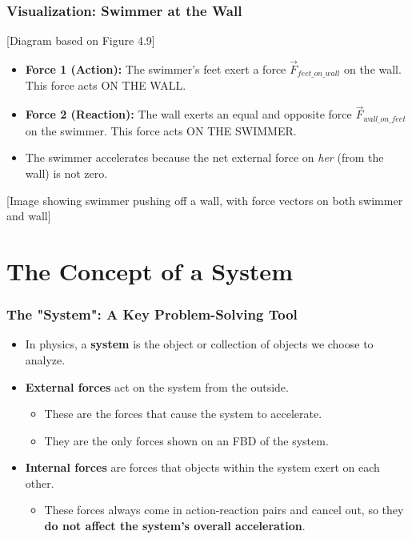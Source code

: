\documentclass{beamer}
\begin{document}
\begin{frame}
\frametitle{Visualization: Swimmer at the Wall}
\begin{alertblock}{[Diagram based on Figure 4.9]}
    \begin{itemize}
        \item \textbf{Force 1 (Action):} The swimmer's feet exert a force $\vec{F}_{feet\_on\_wall}$ on the wall. This force acts ON THE WALL.
        \pause
        \item \textbf{Force 2 (Reaction):} The wall exerts an equal and opposite force $\vec{F}_{wall\_on\_feet}$ on the swimmer. This force acts ON THE SWIMMER.
        \pause
        \item The swimmer accelerates because the net external force on \textit{her} (from the wall) is not zero.
    \end{itemize}
    \alert{[Image showing swimmer pushing off a wall, with force vectors on both swimmer and wall]}
\end{alertblock}
\end{frame}

\section{The Concept of a System}

\begin{frame}
\frametitle{The "System": A Key Problem-Solving Tool}
\begin{itemize}
    \item In physics, a \textbf{system} is the object or collection of objects we choose to analyze. \pause
    \item \textbf{External forces} act on the system from the outside.
    \begin{itemize}
        \item These are the forces that cause the system to accelerate.
        \item They are the only forces shown on an FBD of the system.
    \end{itemize} \pause
    \item \textbf{Internal forces} are forces that objects within the system exert on each other.
    \begin{itemize}
        \item These forces always come in action-reaction pairs and cancel out, so they \textbf{do not affect the system's overall acceleration}.
    \end{itemize}
\end{itemize}
\end{frame}
\end{document}
